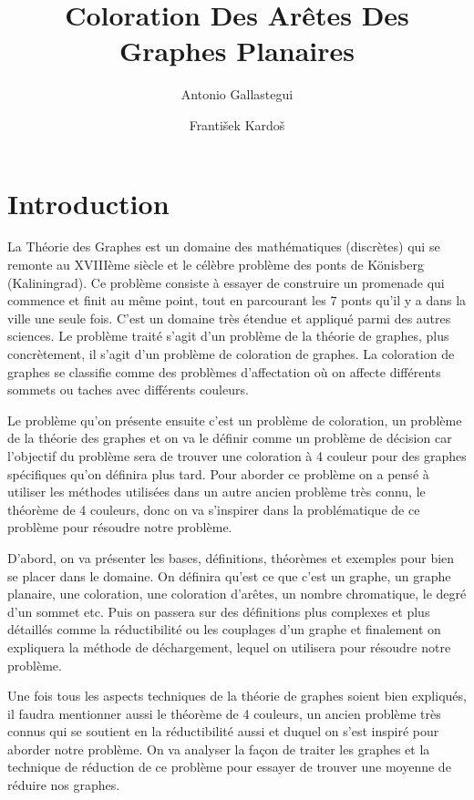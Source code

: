 \documentclass[10pt,a4paper]{article}
\title{Coloration Des Arêtes Des Graphes Planaires}
\author{Antonio Gallastegui \and Franti\v sek Kardo\v s}
\begin{document}
\maketitle
\newpage

\section{Introduction}
La Théorie des Graphes est un domaine des mathématiques (discrètes) qui se remonte au XVIIIème siècle et le célèbre problème des ponts de Könisberg (Kaliningrad). Ce problème consiste à essayer de construire un promenade qui commence et finit au même point, tout en parcourant les 7 ponts qu'il y a dans la ville une seule fois. C'est un domaine très étendue et appliqué parmi des autres sciences. Le problème traité s'agit d'un problème de la théorie de graphes, plus concrètement, il s'agit d'un problème de coloration de graphes.  La coloration de graphes se classifie comme des problèmes d'affectation où on affecte différents sommets ou taches avec différents couleurs. 

Le problème qu'on présente ensuite c'est un problème de coloration, un problème de la théorie des graphes et on va le définir comme un problème de décision car l'objectif du problème sera de trouver une coloration à 4 couleur pour des graphes spécifiques qu'on définira plus tard. Pour aborder ce problème on a pensé à utiliser les méthodes utilisées dans un autre ancien problème très connu, le théorème de 4 couleurs, donc on va s'inspirer dans la problématique de ce problème pour résoudre notre problème.

D'abord, on va présenter les bases, définitions, théorèmes et exemples pour bien se placer dans le domaine. On définira qu'est ce que c'est un graphe, un graphe planaire, une coloration, une coloration d'arêtes, un nombre chromatique, le degré d'un sommet etc. Puis on passera sur des définitions plus complexes et plus détaillés comme la réductibilité ou les couplages d'un graphe et finalement on expliquera la méthode de déchargement, lequel on utilisera pour résoudre notre problème. 

Une fois tous les aspects techniques de la théorie de graphes soient bien expliqués, il faudra mentionner aussi le théorème de 4 couleurs, un ancien problème très connus qui se soutient en la réductibilité aussi et duquel on s'est inspiré pour aborder notre problème. On va analyser la façon de traiter les graphes et la technique de réduction de ce problème pour essayer de trouver une moyenne de réduire nos graphes.
\end{document}
